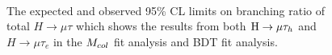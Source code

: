 \begin{figure}[htbp] 
     \centering
     \\
     \caption{The expected and observed 95\% CL limits on branching ratio of total $H \to \mu\tau$ which shows the results from both $\mathrm{H}\to \mu\tau_{h}$ and $H \to \mu\tau_{e}$ in the $M_{col}$ fit analysis and BDT fit analysis.}
     \label{fig:cutbasedpostfit}
\end{figure}



